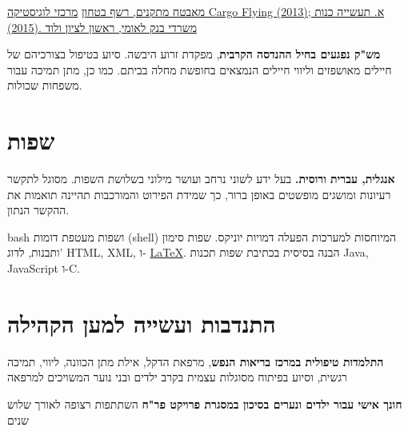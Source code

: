 {\href{https://raw.githubusercontent.com/kiril-u/kiril-resume-2021-1/main/references/recommendation-letter-security-guard.jpg}{מאבטח מתקנים, רשף בטחון}}
{\href{https://raw.githubusercontent.com/kiril-u/kiril-resume-2021-1/main/references/recommendation-letter-security-guard.jpg}{מרכזי לוגיסטיקה Cargo Flying  א. תעשייה כנות ;(2013) משרדי בנק לאומי, ראשון לציון ולוד .(2015)}}
{}

{\textbf{מש"ק נפגעים בחיל ההנדסה הקרבית}, מפקדת זרוע היבשה.}
{סיוע בטיפול בצורכיהם של חיילים מאושפזים וליווי חיילים הנמצאים בחופשת מחלה בביתם. כמו כן, מתן תמיכה עבור משפחות שכולות.}
{}

\section{שפות}

{\textbf{אנגלית, עברית ורוסית.} בעל ידע לשוני נרחב ועושר מילוני בשלושת השפות. מסוגל לתקשר רעיונות ומושגים מופשטים באופן ברור, כך שמידת הפירוט והמורכבות תהיינה תואמות את ההקשר הנתון.} 
{}
{}

{bash
ושפות מעטפת דומות (shell) המיוחסות למערכות הפעלה דמויות יוניקס. שפות סימון ותבנות, לדוג' HTML, XML, ו-
\setLTR\href{https://github.com/kiril-u/kiril-resume-2021-1/}{\LaTeX}.\unsetLTR  
הבנה בסיסית בכתיבת שפות תכנות Java, JavaScript ו-C.}
{}
{}
\section{התנדבות ועשייה למען הקהילה}

{\textbf{התלמדות טיפולית במרכז בריאות הנפש}, מרפאת הדקל, אילת}
{מתן הכוונה, ליווי, תמיכה רגשית, וסיוע בפיתוח מסוגלות עצמית בקרב ילדים ובני נוער המשויכים למרפאה}
{}

{\textbf{חונך אישי עבור ילדים ונערים בסיכון במסגרת פרויקט פר"ח}}
{השתתפות רצופה לאורך שלוש שנים}
{}		
\unsetRTL